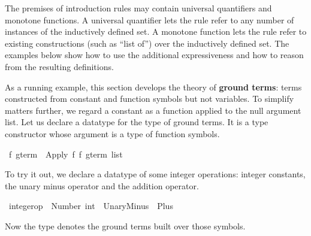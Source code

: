 %
\begin{isabellebody}%
\def\isabellecontext{Advanced}%
%
\isadelimtheory
%
\endisadelimtheory
%
\isatagtheory
%
\endisatagtheory
{\isafoldtheory}%
%
\isadelimtheory
%
\endisadelimtheory
%
\isadelimML
%
\endisadelimML
%
\isatagML
%
\endisatagML
{\isafoldML}%
%
\isadelimML
%
\endisadelimML
%
\begin{isamarkuptext}%
The premises of introduction rules may contain universal quantifiers and
monotone functions.  A universal quantifier lets the rule 
refer to any number of instances of 
the inductively defined set.  A monotone function lets the rule refer
to existing constructions (such as ``list of'') over the inductively defined
set.  The examples below show how to use the additional expressiveness
and how to reason from the resulting definitions.%
\end{isamarkuptext}%
\isamarkuptrue%
%
\isamarkuptrue%
%
\begin{isamarkuptext}%
%
%
As a running example, this section develops the theory of \textbf{ground
terms}: terms constructed from constant and function 
symbols but not variables. To simplify matters further, we regard a
constant as a function applied to the null argument  list.  Let us declare a
datatype  for the type of ground  terms. It is a type constructor
whose argument is a type of  function symbols.%
\end{isamarkuptext}%
\isamarkuptrue%
\isamarkupfalse%
\ {}f\ gterm\ {}\ Apply\ {}f\ {}{}f\ gterm\ list{}%
\begin{isamarkuptext}%
To try it out, we declare a datatype of some integer operations: 
integer constants, the unary minus operator and the addition 
operator.%
\end{isamarkuptext}%
\isamarkuptrue%
\isamarkupfalse%
\ integer{}op\ {}\ Number\ int\ {}\ UnaryMinus\ {}\ Plus%
\begin{isamarkuptext}%
Now the type  denotes the ground 
terms built over those symbols.


\end{isamarkuptext}
\end{isabellebody}
